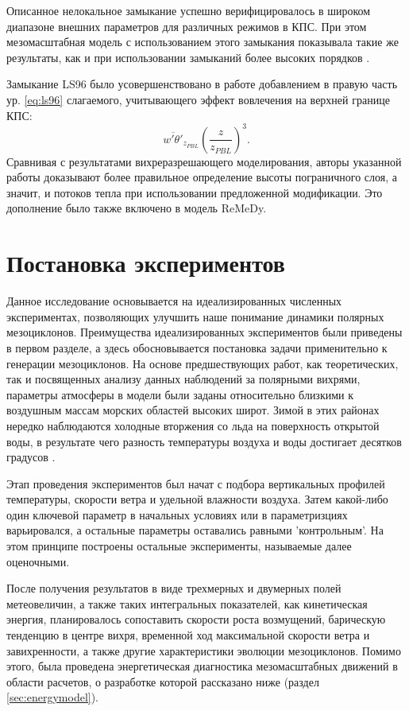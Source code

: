 Описанное нелокальное замыкание успешно верифицировалось в широком диапазоне внешних параметров для различных режимов в КПС. При этом мезомасштабная модель с использованием этого замыкания показывала такие же результаты, как и при использовании замыканий более высоких порядков \citep{ChechinPhD}.

Замыкание LS96 было усовершенствовано в работе \citep{NohEtAl2003} добавлением в правую часть ур. \eqref{eq:ls96} слагаемого, учитывающего эффект вовлечения на верхней границе КПС:
\begin{equation}
\overline{w'\theta'}_{z_{PBL}}\left(\frac{z}{z_{PBL}}\right)^3.
\end{equation}
Сравнивая с результатами вихреразрешающего моделирования, авторы указанной работы доказывают более правильное определение высоты пограничного слоя, а значит, и потоков тепла при использовании предложенной модификации. Это дополнение было также включено в модель ReMeDy.

\section{Постановка экспериментов}
\label{sec:expsetup}
Данное исследование основывается на идеализированных численных экспериментах, позволяющих улучшить наше понимание динамики полярных мезоциклонов. Преимущества идеализированных экспериментов были приведены в первом разделе, а здесь обосновывается постановка задачи применительно к генерации мезоциклонов.
На основе предшествующих работ, как теоретических, так и посвященных анализу данных наблюдений за полярными вихрями, параметры атмосферы в модели были заданы относительно близкими к воздушным массам морских областей высоких широт. Зимой в этих районах нередко наблюдаются холодные вторжения со льда на поверхность открытой воды, в результате чего разность температуры воздуха и воды достигает десятков градусов \citep{RenfrewMoore1999}.

Этап проведения экспериментов был начат с подбора вертикальных профилей температуры, скорости ветра и удельной влажности воздуха. Затем какой-либо один ключевой параметр в начальных условиях или в параметризциях варьировался, а остальные параметры оставались равными 'контрольным'. На этом принципе построены остальные эксперименты, называемые далее оценочными.

После получения результатов в виде трехмерных и двумерных полей метеовеличин, а также таких интегральных показателей, как кинетическая энергия, планировалось сопоставить скорости роста возмущений, барическую тенденцию в центре вихря, временной ход максимальной скорости ветра и завихренности, а также другие характеристики эволюции мезоциклонов. Помимо этого, была проведена энергетическая диагностика мезомасштабных движений в области расчетов, о разработке которой рассказано ниже (раздел \ref{sec:energymodel}).

